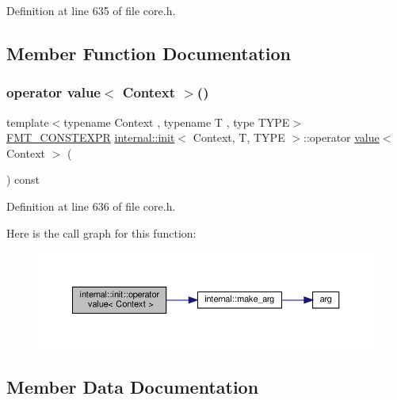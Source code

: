 Definition at line 635 of file core.\+h.



\subsection{Member Function Documentation}
\mbox{\label{structinternal_1_1init_ae658b1b48dc7f8fef0ef1f51adde57c0}} 
\subsubsection{\texorpdfstring{operator value$<$ Context $>$()}{operator value< Context >()}}
{\footnotesize\ttfamily template$<$typename Context , typename T , type T\+Y\+PE$>$ \\
\hyperlink{core_8h_a69201cb276383873487bf68b4ef8b4cd}{F\+M\+T\+\_\+\+C\+O\+N\+S\+T\+E\+X\+PR} \hyperlink{structinternal_1_1init}{internal\+::init}$<$ Context, T, T\+Y\+PE $>$\+::operator \hyperlink{classinternal_1_1value}{value}$<$ Context $>$ (\begin{DoxyParamCaption}{ }\end{DoxyParamCaption}) const\hspace{0.3cm}{\ttfamily [inline]}}



Definition at line 636 of file core.\+h.

Here is the call graph for this function\+:
\nopagebreak
\begin{figure}[H]
\begin{center}
\leavevmode
\includegraphics[width=350pt]{structinternal_1_1init_ae658b1b48dc7f8fef0ef1f51adde57c0_cgraph}
\end{center}
\end{figure}


\subsection{Member Data Documentation}
\mbox{\label{structinternal_1_1init_afddc941e9debc583ce5cb76627b5574d}} 
